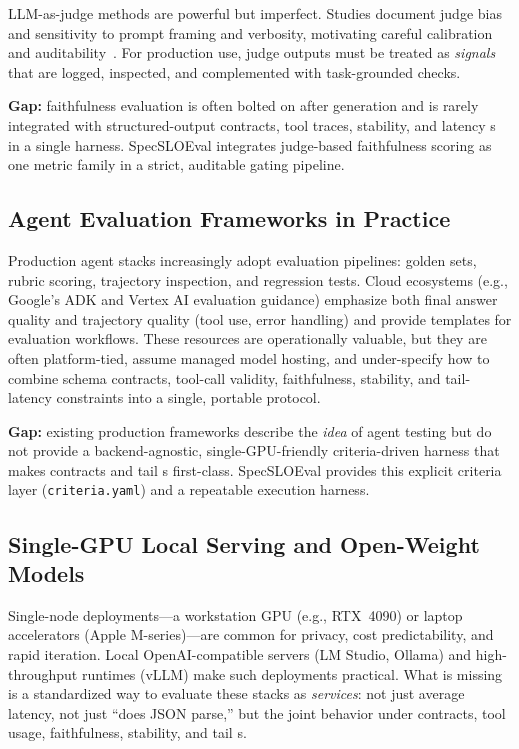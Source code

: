 LLM-as-judge methods are powerful but imperfect.
Studies document judge bias and sensitivity to prompt framing and verbosity, motivating careful calibration and auditability~\citep{llmjudgebias}.
For production use, judge outputs must be treated as \emph{signals} that are logged, inspected, and complemented with task-grounded checks.

\textbf{Gap:} faithfulness evaluation is often bolted on after generation and is rarely integrated with structured-output contracts, tool traces, stability, and latency \slo s in a single harness.
SpecSLOEval integrates judge-based faithfulness scoring as one metric family in a strict, auditable gating pipeline.

\subsection{Agent Evaluation Frameworks in Practice}

Production agent stacks increasingly adopt evaluation pipelines: golden sets, rubric scoring, trajectory inspection, and regression tests.
Cloud ecosystems (e.g., Google’s ADK and Vertex AI evaluation guidance) emphasize both final answer quality and trajectory quality (tool use, error handling) and provide templates for evaluation workflows.
These resources are operationally valuable, but they are often platform-tied, assume managed model hosting, and under-specify how to combine schema contracts, tool-call validity, faithfulness, stability, and tail-latency constraints into a single, portable protocol.

\textbf{Gap:} existing production frameworks describe the \emph{idea} of agent testing but do not provide a backend-agnostic, single-GPU-friendly criteria-driven harness that makes contracts and tail \slo s first-class.
SpecSLOEval provides this explicit criteria layer (\texttt{criteria.yaml}) and a repeatable execution harness.

\subsection{Single-GPU Local Serving and Open-Weight Models}

Single-node deployments---a workstation GPU (e.g., RTX~4090) or laptop accelerators (Apple M-series)---are common for privacy, cost predictability, and rapid iteration.
Local OpenAI-compatible servers (LM Studio, Ollama) and high-throughput runtimes (vLLM) make such deployments practical.
What is missing is a standardized way to evaluate these stacks as \emph{services}: not just average latency, not just “does JSON parse,” but the joint behavior under contracts, tool usage, faithfulness, stability, and tail \slo s.


